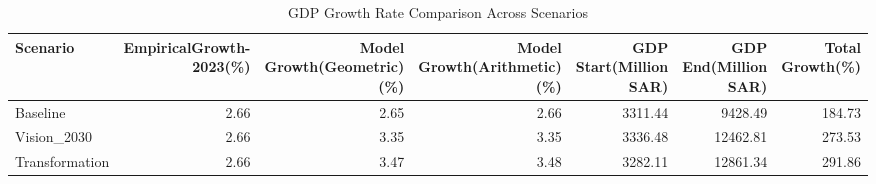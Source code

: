 \begin{table}
\caption{GDP Growth Rate Comparison Across Scenarios}
\label{tab:growth_rates}
\begin{tabular}{lrrrrrr}
\toprule
Scenario & Empirical\newline Growth\newline 2013-2023\newline (\%) & Model Growth\newline (Geometric)\newline (\%) & Model Growth\newline (Arithmetic)\newline (\%) & GDP Start\newline (Million SAR) & GDP End\newline (Million SAR) & Total Growth\newline (\%) \\
\midrule
Baseline & 2.66 & 2.65 & 2.66 & 3311.44 & 9428.49 & 184.73 \\
Vision_2030 & 2.66 & 3.35 & 3.35 & 3336.48 & 12462.81 & 273.53 \\
Transformation & 2.66 & 3.47 & 3.48 & 3282.11 & 12861.34 & 291.86 \\
\bottomrule
\end{tabular}
\end{table}
